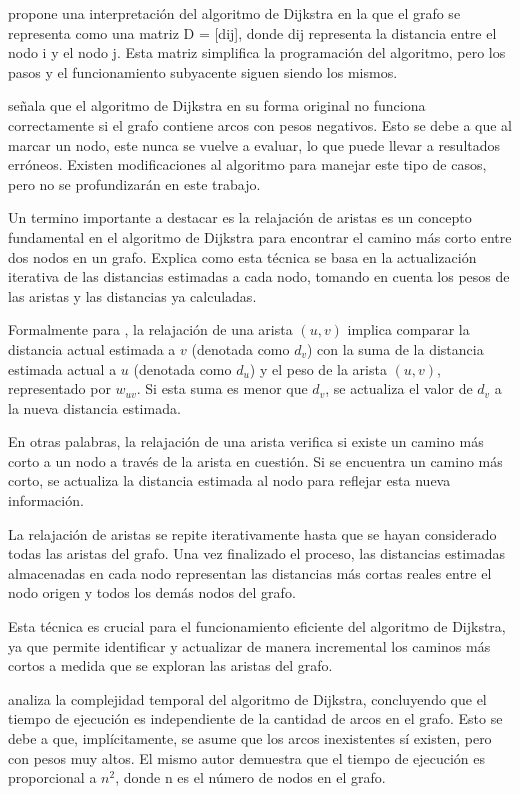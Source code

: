 \cite{deo} propone una interpretación del algoritmo de Dijkstra en la que el grafo se representa como una matriz D = [dij], donde dij representa la distancia entre el nodo i y el nodo j. Esta matriz simplifica la programación del algoritmo, pero los pasos y el funcionamiento subyacente siguen siendo los mismos.

\cite{Minieka} señala que el algoritmo de Dijkstra en su forma original no funciona correctamente si el grafo contiene arcos con pesos negativos. Esto se debe a que al marcar un nodo, este nunca se vuelve a evaluar, lo que puede llevar a resultados erróneos. Existen modificaciones al algoritmo para manejar este tipo de casos, pero no se profundizarán en este trabajo.

Un termino importante a destacar es la relajación de aristas es un concepto fundamental en el algoritmo de Dijkstra para encontrar el camino más corto entre dos nodos en un grafo. \cite{Cormen} Explica como esta técnica se basa en la actualización iterativa de las distancias estimadas a cada nodo, tomando en cuenta los pesos de las aristas y las distancias ya calculadas.

Formalmente para , la relajación de una arista $(u,v)$ implica comparar la distancia actual estimada a $v$ (denotada como $d_v$) con la suma de la distancia estimada actual a $u$ (denotada como $d_u$) y el peso de la arista $(u,v)$, representado por $w_{uv}$. Si esta suma es menor que $d_v$, se actualiza el valor de $d_v$ a la nueva distancia estimada.

En otras palabras, la relajación de una arista verifica si existe un camino más corto a un nodo a través de la arista en cuestión. Si se encuentra un camino más corto, se actualiza la distancia estimada al nodo para reflejar esta nueva información.

La relajación de aristas se repite iterativamente hasta que se hayan considerado todas las aristas del grafo. Una vez finalizado el proceso, las distancias estimadas almacenadas en cada nodo representan las distancias más cortas reales entre el nodo origen y todos los demás nodos del grafo.

Esta técnica es crucial para el funcionamiento eficiente del algoritmo de Dijkstra, ya que permite identificar y actualizar de manera incremental los caminos más cortos a medida que se exploran las aristas del grafo.


\cite{deo} analiza la complejidad temporal del algoritmo de Dijkstra, concluyendo que el tiempo de ejecución es independiente de la cantidad de arcos en el grafo. Esto se debe a que, implícitamente, se asume que los arcos inexistentes sí existen, pero con pesos muy altos. El mismo autor demuestra que el tiempo de ejecución es proporcional a \( n^2 \), donde n es el número de nodos en el grafo.

